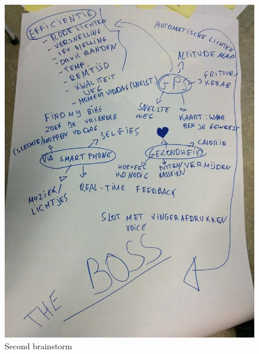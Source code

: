 \begin{figure}[H]
\center
 \includegraphics[width=\linewidth]{brainstorm/brainstorm2.jpg}
 \caption{Second brainstorm}
 \label{image:ganttchart}
\end{figure}